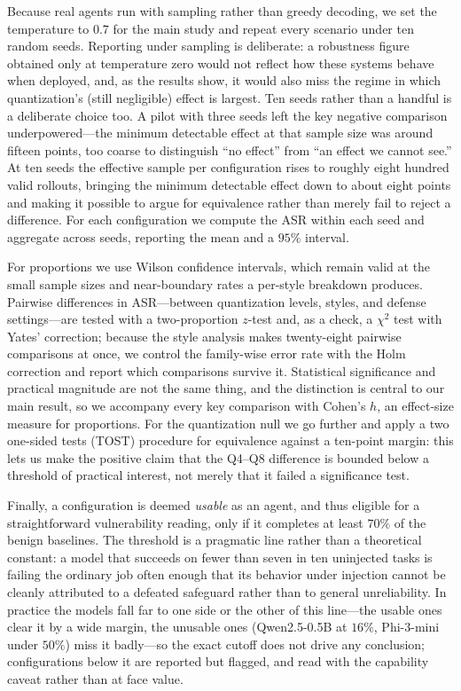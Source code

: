 \documentclass[11pt]{article}
\begin{document}
Because real agents run with sampling rather than greedy decoding, we set
the temperature to $0.7$ for the main study and repeat every scenario under
ten random seeds. Reporting under sampling is deliberate: a robustness
figure obtained only at temperature zero would not reflect how these systems
behave when deployed, and, as the results show, it would also miss the
regime in which quantization's (still negligible) effect is largest. Ten
seeds rather than a handful is a deliberate choice too. A pilot with three
seeds left the key negative comparison underpowered---the minimum
detectable effect at that sample size was around fifteen points, too coarse
to distinguish ``no effect'' from ``an effect we cannot see.'' At ten seeds
the effective sample per configuration rises to roughly eight hundred valid
rollouts, bringing the minimum detectable effect down to about eight points
and making it possible to argue for equivalence rather than merely fail to
reject a difference. For each configuration we compute the ASR within each
seed and aggregate across seeds, reporting the mean and a $95\%$ interval.

For proportions we use Wilson confidence intervals, which remain valid at
the small sample sizes and near-boundary rates a per-style breakdown
produces. Pairwise differences in ASR---between quantization levels, styles,
and defense settings---are tested with a two-proportion $z$-test and, as a
check, a $\chi^2$ test with Yates' correction; because the style analysis
makes twenty-eight pairwise comparisons at once, we control the family-wise
error rate with the Holm correction and report which comparisons survive it.
Statistical significance and practical magnitude are not the same thing, and
the distinction is central to our main result, so we accompany every key
comparison with Cohen's $h$, an effect-size measure for proportions. For the
quantization null we go further and apply a two one-sided tests (TOST)
procedure for equivalence against a ten-point margin: this lets us make the
positive claim that the Q4--Q8 difference is bounded below a threshold of
practical interest, not merely that it failed a significance test.

Finally, a configuration is deemed \emph{usable} as an agent, and thus
eligible for a straightforward vulnerability reading, only if it completes
at least $70\%$ of the benign baselines. The threshold is a pragmatic line
rather than a theoretical constant: a model that succeeds on fewer than
seven in ten uninjected tasks is failing the ordinary job often enough that
its behavior under injection cannot be cleanly attributed to a defeated
safeguard rather than to general unreliability. In practice the models fall
far to one side or the other of this line---the usable ones clear it by a
wide margin, the unusable ones (Qwen2.5-0.5B at $16\%$, Phi-3-mini under
$50\%$) miss it badly---so the exact cutoff does not drive any conclusion;
configurations below it are reported but flagged, and read with the
capability caveat rather than at face value.
\end{document}
